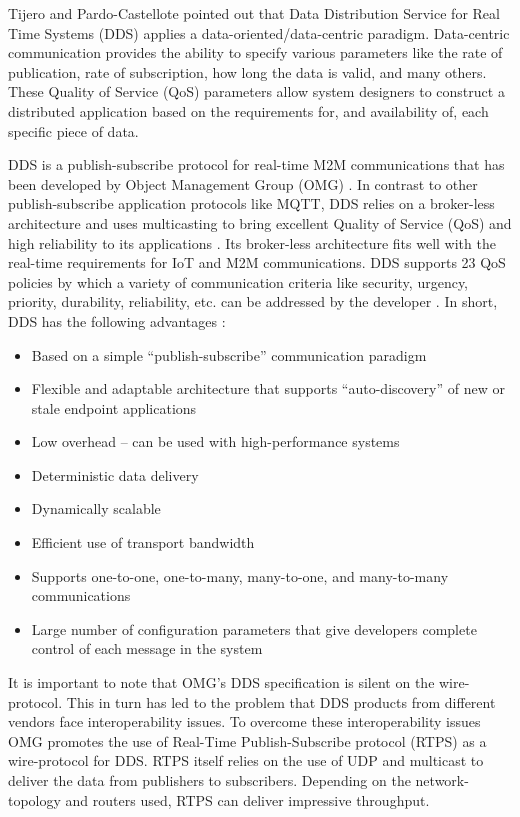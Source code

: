 Tijero \cite{tijero2012schedulability} and Pardo-Castellote \cite{pardo2005introduction} pointed out that Data Distribution Service for Real Time Systems (DDS) applies a data-oriented/data-centric paradigm. Data-centric communication provides the ability to specify various parameters like the rate of publication, rate of subscription, how long the data is valid, and many others. These Quality of Service (QoS) parameters allow system designers to construct a distributed application based on the requirements for, and availability of, each specific piece of data.

DDS is a publish-subscribe protocol for real-time M2M communications that has been developed by Object Management Group (OMG) \cite{dds}. In contrast to other publish-subscribe application protocols like MQTT, DDS relies on a broker-less architecture and uses multicasting to bring excellent Quality of Service (QoS) and high reliability to its applications \cite{7123563}. Its broker-less architecture fits well with the real-time requirements for IoT and M2M communications. DDS supports 23 QoS policies by which a variety of communication criteria like security, urgency, priority, durability, reliability, etc. can be addressed by the developer \cite{7123563}. In short, DDS has the following advantages \cite{pardo2005introduction}:

\begin{itemize}
\item Based on a simple ``publish-subscribe'' communication paradigm
\item Flexible and adaptable architecture that supports ``auto-discovery'' of new or stale endpoint applications
\item Low overhead -- can be used with high-performance systems
\item Deterministic data delivery
\item Dynamically scalable
\item Efficient use of transport bandwidth
\item Supports one-to-one, one-to-many, many-to-one, and many-to-many communications
\item Large number of configuration parameters that give developers complete control of each message in the system
\end{itemize}

It is important to note that OMG's DDS specification is silent on the wire-protocol. This in turn has led to the problem that DDS products from different vendors face interoperability issues. To overcome these interoperability issues OMG promotes the use of Real-Time Publish-Subscribe protocol (RTPS) \cite{rtps} as a wire-protocol for DDS. RTPS itself relies on the use of UDP and multicast to deliver the data from publishers to subscribers. Depending on the network-topology and routers used, RTPS can deliver impressive throughput. 

